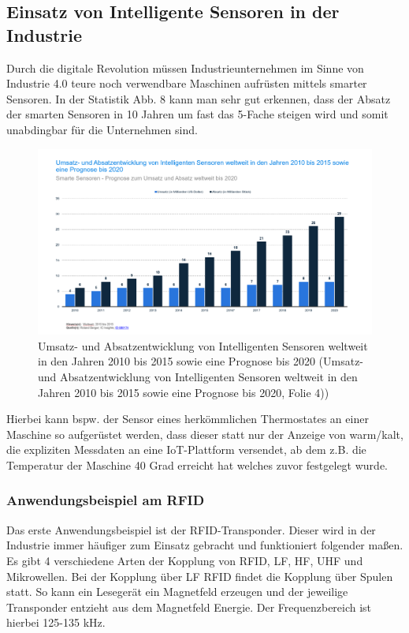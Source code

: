 \documentclass[a4paper,12pt]{scrartcl}
\begin{document}
\newpage
\subsection{Einsatz von Intelligente Sensoren in der Industrie}
Durch die digitale Revolution müssen Industrieunternehmen im Sinne von Industrie 4.0 teure noch verwendbare Maschinen aufrüsten mittels smarter Sensoren. 
In der Statistik Abb. 8 kann man sehr gut erkennen, dass der Absatz der smarten Sensoren in 10 Jahren um fast das 5-Fache steigen wird und somit unabdingbar für die Unternehmen sind.

\begin{figure}[H]
\centering
\includegraphics[scale=0.28]{picture/Prognose2020_1}
\caption{Umsatz- und Absatzentwicklung von Intelligenten Sensoren weltweit in den Jahren 2010 bis 2015 sowie eine Prognose bis 2020 (Umsatz- und Absatzentwicklung von Intelligenten Sensoren weltweit in den Jahren 2010 bis 2015 sowie eine Prognose bis 2020, Folie 4))}
\label{fig:Umsatz- und Absatzentwicklung von Intelligenten Sensoren weltweit in den Jahren 2010 bis 2015 Balkendiagramm}
\end{figure}

Hierbei kann bspw. der Sensor eines herkömmlichen Thermostates an einer Maschine so aufgerüstet werden, dass dieser statt nur der Anzeige von warm/kalt, die expliziten Messdaten an eine IoT-Plattform versendet, ab dem z.B. die Temperatur der Maschine 40 Grad erreicht hat welches zuvor festgelegt wurde.\cite{ComarchAG.}

\subsubsection{Anwendungsbeispiel am RFID}
Das erste Anwendungsbeispiel ist der RFID-Transponder. Dieser wird in der Industrie immer häufiger zum Einsatz gebracht und funktioniert folgender maßen. 
Es gibt 4 verschiedene Arten der Kopplung von RFID, LF, HF, UHF und Mikrowellen. 
Bei der Kopplung über LF RFID findet die Kopplung über Spulen statt. So kann ein Lesegerät ein Magnetfeld erzeugen und der jeweilige Transponder entzieht aus dem Magnetfeld Energie. Der Frequenzbereich ist hierbei 125-135 kHz.
\end{document}
